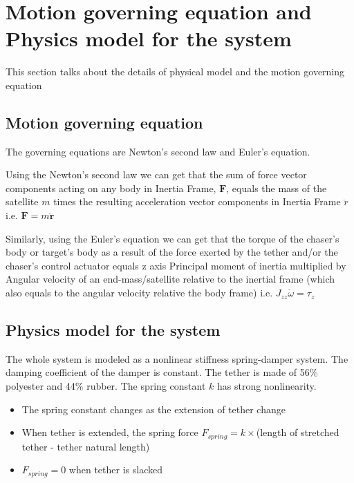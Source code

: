 \section{Motion governing equation and Physics model for the system}

This section talks about the details of physical model and the motion governing equation

\subsection{Motion governing equation}

The governing equations are Newton's second law and Euler's equation.

Using the Newton's second law we can get that the sum of force vector components acting on any body in Inertia Frame, $\mathbf{F}$, equals the mass of the satellite $m$ times the resulting acceleration vector components in Inertia Frame $\ddot{r}$ i.e. $\mathbf{F} = m\mathbf{\ddot{r}}$

Similarly, using the Euler's equation we can get that the torque of the chaser's body or target's body as a result of the force exerted by the tether and/or the chaser's control actuator equals z axis Principal moment of inertia multiplied by Angular velocity of an end-mass/satellite relative to the inertial frame (which also equals to the angular velocity relative the body frame) i.e. $J_{zz} \dot{\omega} = \tau_z$ 

\subsection{Physics model for the system}

The whole system is modeled as a nonlinear stiffness spring-damper system. The damping coefficient of the damper is constant. The tether is made of 56\% polyester and 44\% rubber. The spring constant $k$ has strong nonlinearity. 

\begin{itemize}

\item The spring constant changes as the extension of tether change 

\item When tether is extended, the spring force $F_{spring} = k\times $(length of stretched tether - tether natural length)

\item $F_{spring} = 0$ when tether is slacked

\end{itemize}

